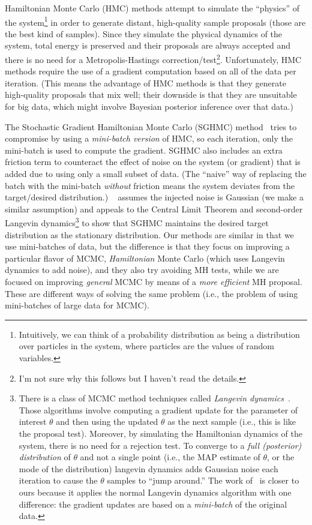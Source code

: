 \documentclass{article}
\begin{document}
Hamiltonian Monte Carlo (HMC) methods attempt to simulate the ``physics'' of the
system\footnote{Intuitively, we can think of a probability distribution as being a distribution over
particles in the system, where particles are the values of random variables.} in order to generate
distant, high-quality sample proposals (those are the best kind of samples). Since they simulate the
physical dynamics of the system, total energy is preserved and their proposals are always
accepted and there is no need for a Metropolis-Hastings correction/test\footnote{I'm not sure why
this follows but I haven't read the details.}. Unfortunately, HMC methods require the use of a
gradient computation based on all of the data per iteration. (This means the advantage of HMC
methods is that they generate high-quality proposals that mix well; their downside is that they are
unsuitable for big data, which might involve Bayesian posterior inference over that data.)

The Stochastic Gradient Hamiltonian Monte Carlo (SGHMC) method~
\cite{sghmc_2014} tries to compromise
by using a \emph{mini-batch version} of HMC, so each iteration, only the mini-batch is used to
compute the gradient.  SGHMC also includes an extra friction term to counteract the effect of noise
on the system (or gradient) that is added due to using only a small subset of data. (The ``naive''
way of replacing the batch with the mini-batch \emph{without} friction means the system deviates
from the target/desired distribution.) ~\cite{sghmc_2014} assumes the injected noise is Gaussian (we
make a similar assumption) and appeals to the Central Limit Theorem and second-order Langevin
dynamics\footnote{There is a class of MCMC method techniques called \emph{Langevin dynamics}~\cite{mcmc_hamiltonian_2010}. Those algorithms involve computing a gradient update for the parameter of interest $\theta$ and then using the updated $\theta$ as the next sample (i.e., this is like the proposal test). Moreover, by simulating the Hamiltonian dynamics of the system, there is no need for a rejection test. To converge to a \emph{full (posterior) distribution} of $\theta$ and not a single point (i.e., the MAP estimate of $\theta$, or the mode of the distribution) langevin dynamics adds Gaussian noise each iteration to cause the $\theta$ samples to ``jump around.'' The work of~\cite{langevin_2011} is closer to ours because it applies the normal Langevin dynamics algorithm with one difference: the gradient updates are based on a \emph{mini-batch} of the original data.} to show that SGHMC maintains the desired target distribution as the stationary
distribution. Our methods are similar in that we use mini-batches of data, but the difference is
that they focus on improving a particular flavor of MCMC, \emph{Hamiltonian} Monte Carlo (which uses Langevin dynamics to add noise), and they
also try avoiding MH tests, while we are focused on improving \emph{general} MCMC by means of a \emph{more efficient} MH proposal. These are different ways of solving the same problem (i.e., the problem of using mini-batches of
large data for MCMC).
\end{document}

